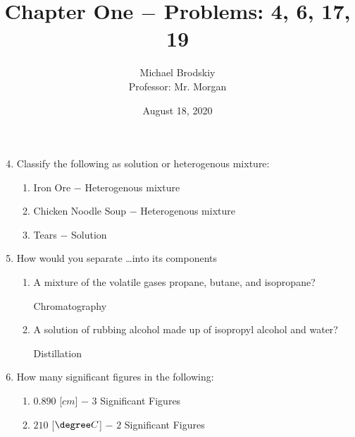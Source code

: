 \documentclass[12pt]{article}
\title{Chapter One $-$ Problems: 4, 6, 17, 19}
\date{August 18, 2020}
\author{Michael Brodskiy\\ \small Professor: Mr. Morgan}
\begin{document}
\maketitle

\begin{enumerate}
    \setcounter{enumi}{3}

\item Classify the following as solution or heterogenous mixture:

  \begin{enumerate}

    \item Iron Ore $-$ Heterogenous mixture

    \item Chicken Noodle Soup $-$ Heterogenous mixture

    \item Tears $-$ Solution

  \end{enumerate}

  \setcounter{enumi}{5}

\item How would you separate \dots into its components

  \begin{enumerate}

    \item A mixture of the volatile gases propane, butane, and isopropane?

      \begin{justify} Chromatography \end{justify}

    \item A solution of rubbing alcohol made up of isopropyl alcohol and water?

      \begin{justify} Distillation \end{justify}

  \end{enumerate}

  \item How many significant figures in the following:

    \begin{enumerate}

      \item $0.890$ [$cm$] $-$ $3$ Significant Figures

      \item $210$ [$\degree C$] $-$ $2$ Significant Figures


\end{enumerate}
\end{enumerate}
\end{document}
